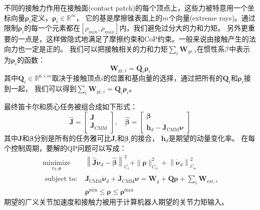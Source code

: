 不同的接触力作用在接触面(contact patch)的每个顶点上，这些力被特意用一个坐标向量$\boldsymbol{\rho}_i$定义，$\boldsymbol{\rho}_i \in \mathbb{R}^{m}$，
它的基是摩擦锥表面上的$m$个向量(extreme rays)。通过限制$\boldsymbol{\rho}_i$的每一个元素都在$\left[\rho_{min}, \rho_{max}\right]$内，我们避免过分大的力和力矩。
另外更重要的一点是，这样做隐式地满足了摩擦约束和CoP约束。一般来说由接触产生的法向力也一定是正的。
我们可以把接触相关的力和力矩$\sum_i {\boldsymbol{W}_{gr,i}}$在惯性系$\mathcal{I}$中表示为$\boldsymbol{\rho}_i$的函数：
\begin{equation}
    \label{equ:qp_grf_coord}
    \boldsymbol{W}_{\mathrm{gr}, i}=\boldsymbol{Q}_i \boldsymbol{\rho}_i
\end{equation}
其中$\boldsymbol{Q}_i \in \mathbb{R}^{6 \times m}$取决于接触顶点$i$的位置和基向量的选择，通过把所有的$\boldsymbol{Q}_i$和$\boldsymbol{\rho}_i$接到一起，
我们可以得到$\sum_i {\boldsymbol{W}_{\mathrm{gr}, i}}=\boldsymbol{Q}_i \boldsymbol{\rho}_i$。

最终笛卡尔和质心任务被组合成如下形式：
\begin{equation}
    \label{equ:qp_cartesian_com_task}
    \hat{\boldsymbol{J}}=\left[\begin{array}{c}
        \boldsymbol{J} \\
        \boldsymbol{J}_{\mathrm{CMM}}
        \end{array}\right], \quad \hat{\boldsymbol{\beta}}=\left[\begin{array}{c}
        \boldsymbol{\beta} \\
        \dot{\boldsymbol{h}}_d-\dot{\boldsymbol{J}}_{\mathrm{CMM}} \boldsymbol{\nu}
        \end{array}\right]
\end{equation}
其中$\boldsymbol{J}$和$\boldsymbol{\beta}$分别是所有的任务雅可比$\boldsymbol{J}_i$和$\boldsymbol{\beta}_i$的接合，
$\dot{\boldsymbol{h}}_d$是期望的动量变化率。
在每个控制周期，要解的QP问题可以写成：
\begin{equation}
    \label{equ:qp_final}
    \begin{aligned}
        \underset{\dot{\nu}_d, \boldsymbol{\rho}}{\operatorname{minimize}} & \left\|\hat{\boldsymbol{J}} \dot{\boldsymbol{\nu}}_d-\hat{\boldsymbol{\beta}}\right\|_{C_t}^2+\|\boldsymbol{\rho}\|_{C_\rho}^2+\left\|\dot{\boldsymbol{\nu}}_d\right\|_{C_{\dot{\boldsymbol{\nu}}}}^2 \\
        \text { subject to: } & \boldsymbol{J}_{\mathrm{CMM}} \dot{\boldsymbol{\nu}}_d+\dot{\boldsymbol{J}}_{\mathrm{CMM}} \boldsymbol{\nu}=\boldsymbol{W}_g+\boldsymbol{Q} \boldsymbol{\rho}+\sum_i \boldsymbol{W}_{\mathrm{ext}, i} \\
        & \boldsymbol{\rho}^{\min } \leq \boldsymbol{\rho} \leq \boldsymbol{\rho}^{\max }
        \end{aligned}
\end{equation}
期望的广义关节加速度和接触力被用于计算机器人期望的关节力矩输入。

